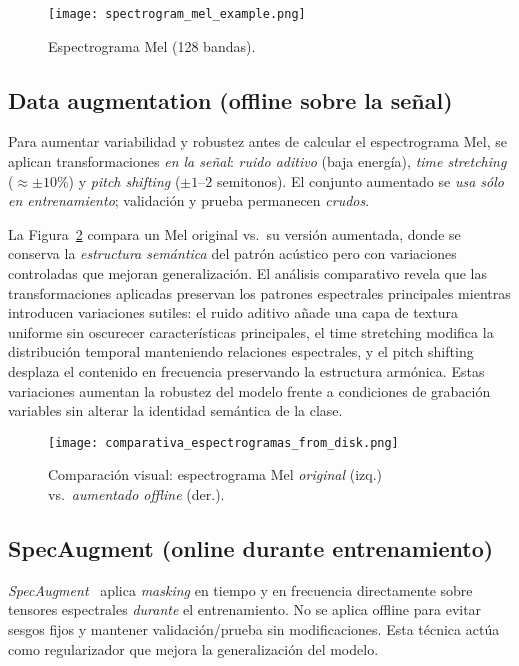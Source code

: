 \documentclass[conference]{IEEEtran}
\begin{document}
\begin{figure}[b]
    \centering
    \texttt{[image: spectrogram\_mel\_example.png]}
    \caption{Espectrograma Mel (128 bandas).}
    \label{fig:mel}
\end{figure}

\subsection{Data augmentation (offline sobre la señal)}
Para aumentar variabilidad y robustez antes de calcular el espectrograma Mel, se aplican transformaciones \emph{en la señal}: \emph{ruido aditivo} (baja energía), \emph{time stretching} ($\approx\pm10\%$) y \emph{pitch shifting} ($\pm1$--$2$ semitonos). El conjunto aumentado se \emph{usa sólo en entrenamiento}; validación y prueba permanecen \emph{crudos}. 

La Figura~\ref{fig:comparativa} compara un Mel original vs.\ su versión aumentada, donde se conserva la \emph{estructura semántica} del patrón acústico pero con variaciones controladas que mejoran generalización. El análisis comparativo revela que las transformaciones aplicadas preservan los patrones espectrales principales mientras introducen variaciones sutiles: el ruido aditivo añade una capa de textura uniforme sin oscurecer características principales, el time stretching modifica la distribución temporal manteniendo relaciones espectrales, y el pitch shifting desplaza el contenido en frecuencia preservando la estructura armónica. Estas variaciones aumentan la robustez del modelo frente a condiciones de grabación variables sin alterar la identidad semántica de la clase.

\begin{figure}[b]
    \centering
    \texttt{[image: comparativa\_espectrogramas\_from\_disk.png]}
    \caption{Comparación visual: espectrograma Mel \emph{original} (izq.) vs.\ \emph{aumentado offline} (der.).}
    \label{fig:comparativa}
\end{figure}

\subsection{SpecAugment (online durante entrenamiento)}
\emph{SpecAugment}~\cite{park2019specaugment} aplica \emph{masking} en tiempo y en frecuencia directamente sobre tensores espectrales \emph{durante} el entrenamiento. No se aplica offline para evitar sesgos fijos y mantener validación/prueba sin modificaciones. Esta técnica actúa como regularizador que mejora la generalización del modelo.
\end{document}
